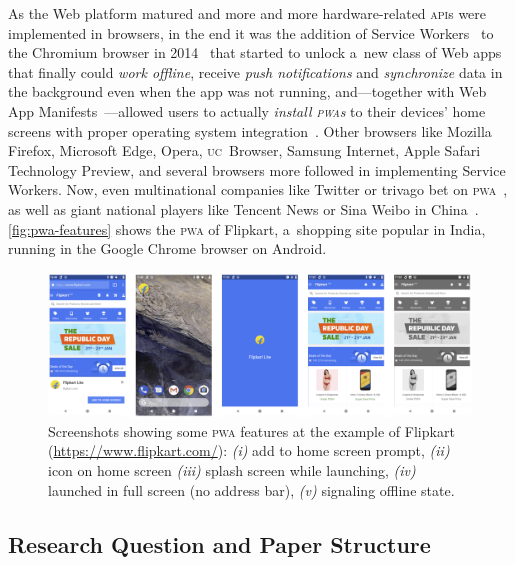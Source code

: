 \documentclass[sigconf]{acmart}
\begin{document}
As the Web platform matured and more and more
hardware-related \textsc{api}s were implemented in browsers,
in the end it was the addition of Service Workers~\cite{russell2017serviceworkers}
to the Chromium browser in 2014~\cite{cooney2014chromium} that started to unlock a~new class of Web apps
that finally could \emph{work offline}, receive \emph{push notifications}
and \emph{synchronize} data in the background even when the app was not running,
and---together with Web App Manifests~\cite{caceres2017manifest}---allowed
users to actually \emph{install \textsc{pwa}s} to their devices' home screens
with proper operating system integration~\cite{kinlan2017a2hs}.
Other browsers like Mozilla Firefox, Microsoft Edge, Opera, \textsc{uc}~Browser, Samsung Internet,
Apple Safari Technology Preview, and several browsers more followed in implementing Service Workers.
Now, even multinational companies like Twitter
or trivago bet on \textsc{pwa}~\cite{gallagher2017twitterlite,twg2017trivago},
as well as giant national players like Tencent News or Sina Weibo in China~\cite{zhu2017pwa}.
\autoref{fig:pwa-features} shows the \textsc{pwa} of Flipkart, a~shopping site popular in India,
running in the Google Chrome browser on Android.

\begin{figure}[hbt]
  \centering
  \includegraphics[width=\columnwidth]{pwa-features}
  \caption[Screenshots showing some \textsc{pwa} features]{
    Screenshots showing some \textsc{pwa} features at the example of Flipkart (\url{https://www.flipkart.com/}):
    \emph{(i)} add to home screen prompt, \emph{(ii)} icon on home screen
    \emph{(iii)} splash screen while launching, \emph{(iv)} launched in full screen (no address bar),
    \emph{(v)} signaling offline state.}
  \label{fig:pwa-features}
\end{figure}

\subsection{Research Question and Paper Structure}
\end{document}
